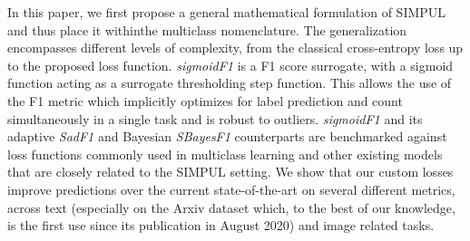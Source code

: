 In this paper, we first propose a general mathematical formulation of SIMPUL and thus place it withinthe multiclass nomenclature. The generalization encompasses different levels of complexity, from the classical cross-entropy loss up to the proposed loss function. \emph{sigmoidF1} is a F1 score surrogate, with a sigmoid function acting as a surrogate thresholding step function. This allows the use of the F1 metric which implicitly optimizes for label prediction and count simultaneously in a single task and is robust to outliers.  \emph{sigmoidF1} and its adaptive \emph{SadF1} and Bayesian \emph{SBayesF1} counterparts are benchmarked against loss functions commonly used in multiclass learning and other existing models that are closely related to the SIMPUL setting. We show that our custom losses improve predictions over the current  state-of-the-art on several different metrics, across text (especially on the Arxiv dataset which, to the best of our knowledge, is the first use since its publication in August 2020) and image related tasks.










